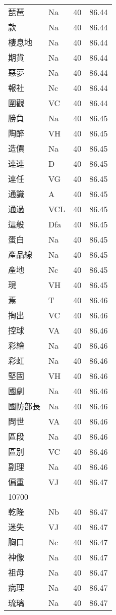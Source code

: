 \documentclass[twocolumn]{book}
\begin{document}
\begin{supertabular}{llrr}
琵琶 & Na & 40 &  86.44\\
款 & Na & 40 &  86.44\\
棲息地 & Na & 40 &  86.44\\
期貨 & Na & 40 &  86.44\\
惡夢 & Na & 40 &  86.44\\
報社 & Nc & 40 &  86.44\\
圍觀 & VC & 40 &  86.44\\
勝負 & Na & 40 &  86.45\\
陶醉 & VH & 40 &  86.45\\
造價 & Na & 40 &  86.45\\
連連 & D & 40 &  86.45\\
連任 & VG & 40 &  86.45\\
通識 & A & 40 &  86.45\\
通過 & VCL & 40 &  86.45\\
這般 & Dfa & 40 &  86.45\\
蛋白 & Na & 40 &  86.45\\
產品線 & Na & 40 &  86.45\\
產地 & Nc & 40 &  86.45\\
現 & VH & 40 &  86.45\\
焉 & T & 40 &  86.46\\
掏出 & VC & 40 &  86.46\\
控球 & VA & 40 &  86.46\\
彩繪 & Na & 40 &  86.46\\
彩虹 & Na & 40 &  86.46\\
堅固 & VH & 40 &  86.46\\
國劇 & Na & 40 &  86.46\\
國防部長 & Na & 40 &  86.46\\
問世 & VA & 40 &  86.46\\
區段 & Na & 40 &  86.46\\
區別 & VC & 40 &  86.46\\
副理 & Na & 40 &  86.46\\
偏重 & VJ & 40 &  86.47\\
10700\\
乾隆 & Nb & 40 &  86.47\\
迷失 & VJ & 40 &  86.47\\
胸口 & Nc & 40 &  86.47\\
神像 & Na & 40 &  86.47\\
祖母 & Na & 40 &  86.47\\
病理 & Na & 40 &  86.47\\
琉璃 & Na & 40 &  86.47\\

\end{supertabular}
\end{document}

